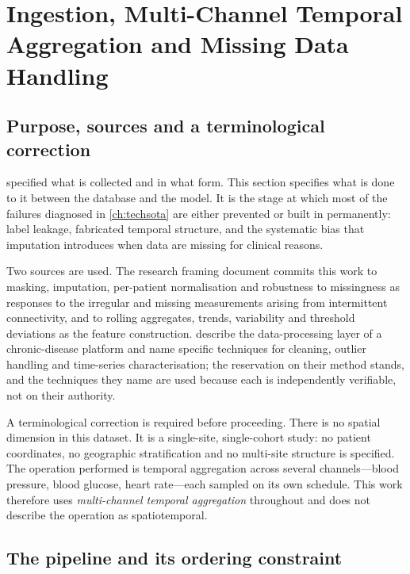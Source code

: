 \documentclass[12pt,a4paper,oneside]{report}
\begin{document}
\section{Ingestion, Multi-Channel Temporal Aggregation and Missing Data Handling}\label{sec:preprocessing}

\subsection*{Purpose, sources and a terminological correction}

 specified what is collected and in what form. This section specifies what is done to it between the database and the model. It is the stage at which most of the failures diagnosed in \cref{ch:techsota} are either prevented or built in permanently: label leakage, fabricated temporal structure, and the systematic bias that imputation introduces when data are missing for clinical reasons.

Two sources are used. The research framing document commits this work to masking, imputation, per-patient normalisation and robustness to missingness as responses to the irregular and missing measurements arising from intermittent connectivity, and to rolling aggregates, trends, variability and threshold deviations as the feature construction. \Textcite{liu2025review} describe the data-processing layer of a chronic-disease platform and name specific techniques for cleaning, outlier handling and time-series characterisation; the reservation on their method stands, and the techniques they name are used because each is independently verifiable, not on their authority.

A terminological correction is required before proceeding. There is no spatial dimension in this dataset. It is a single-site, single-cohort study: no patient coordinates, no geographic stratification and no multi-site structure is specified. The operation performed is temporal aggregation across several channels---blood pressure, blood glucose, heart rate---each sampled on its own schedule. This work therefore uses \emph{multi-channel temporal aggregation} throughout and does not describe the operation as spatiotemporal.

\subsection{The pipeline and its ordering constraint}\label{sec:pipeline}
\end{document}
